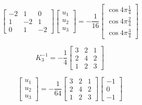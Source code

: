 \documentclass{extarticle}
\begin{document}
    \begin{equation*}
        \begin{bmatrix}
            -2 & 1 & 0 \\
            1 & -2 & 1 \\
            0 & 1 & -2
        \end{bmatrix}
        \begin{bmatrix}
            u_1 \\
            u_2 \\
            u_3
        \end{bmatrix}
        = -\frac{1}{16}
        \begin{bmatrix}
            \cos{4\pi\frac{1}{4}} \\
            \cos{4\pi\frac{2}{4}} \\
            \cos{4\pi\frac{3}{4}}
        \end{bmatrix}
    \end{equation*}

    \begin{equation*}
        K_3^{-1} = -\frac{1}{4}
        \begin{bmatrix}
            3 & 2 & 1 \\
            2 & 4 & 2 \\
            1 & 2 & 3
        \end{bmatrix}
    \end{equation*}

    \begin{equation*}
        \begin{bmatrix}
            u_1 \\
            u_2 \\
            u_3
        \end{bmatrix}
        = -\frac{1}{64}
        \begin{bmatrix}
            3 & 2 & 1 \\
            2 & 4 & 2 \\
            1 & 2 & 3
        \end{bmatrix}
        \begin{bmatrix}
            -1 \\
            0 \\
            -1
        \end{bmatrix}
    \end{equation*}
\end{document}
